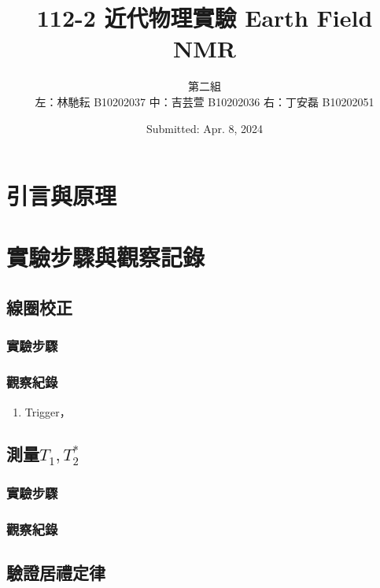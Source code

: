 \documentclass[twocolumn]{article}
\title{112-2 近代物理實驗 Earth Field NMR\\\vspace{1cm}}
\author{第二組 \\ 左：林馳耘 B10202037 中：吉芸萱 B10202036 右：丁安磊 B10202051}
\date{Submitted: Apr. 8, 2024}
\begin{document}
\newcommand{\momega}{~{\rm m}\Omega}
\renewcommand{\figurename}{圖}
\renewcommand{\tablename}{表}
\newcommand{\br}[1]{\left(#1\right)}
\renewcommand{\vb}[1]{\boldsymbol{\mathbf{#1}}} %
\newcommand\inlineeqno{\refstepcounter{equation}~~ \hspace*{\fill} \mbox{(\theequation)}}

\maketitle

\section{引言與原理}



\section{實驗步驟與觀察記錄}

\subsection{線圈校正}
\subsubsection*{實驗步驟}
\subsubsection*{觀察紀錄}
\begin{enumerate}
    \item Trigger，
\end{enumerate}

\subsection{測量$T_1, T_2^*$}
\subsubsection*{實驗步驟}
\subsubsection*{觀察紀錄}

\subsection{驗證居禮定律}
\end{document}
